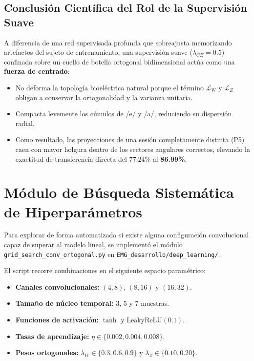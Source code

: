 \documentclass[11pt,a4paper,openany]{book}
\theoremstyle{definition}
\begin{document}
\subsection{Conclusión Científica del Rol de la Supervisión Suave}
\label{subsec:conclusion_supervision}

A diferencia de una red supervisada profunda que sobreajusta memorizando artefactos del sujeto de entrenamiento, una supervisión suave ($\lambda_{CE} = 0.5$) confinada sobre un cuello de botella ortogonal bidimensional actúa como una \textbf{fuerza de centrado}:
\begin{itemize}
    \item No deforma la topología bioeléctrica natural porque el término $\mathcal{L}_W$ y $\mathcal{L}_Z$ obligan a conservar la ortogonalidad y la varianza unitaria.
    \item Compacta levemente los cúmulos de /e/ y /a/, reduciendo su dispersión radial.
    \item Como resultado, las proyecciones de una sesión completamente distinta (P5) caen con mayor holgura dentro de los sectores angulares correctos, elevando la exactitud de transferencia directa del $77.24\%$ al \textbf{86.99\%}.
\end{itemize}

\section{Módulo de Búsqueda Sistemática de Hiperparámetros}
\label{sec:grid_search}

Para explorar de forma automatizada si existe alguna configuración convolucional capaz de superar al modelo lineal, se implementó el módulo \texttt{grid\_search\_conv\_ortogonal.py} en \texttt{EMG\_desarrollo/deep\_learning/}.

El script recorre combinaciones en el siguiente espacio paramétrico:
\begin{itemize}
    \item \textbf{Canales convolucionales:} $(4, 8)$, $(8, 16)$ y $(16, 32)$.
    \item \textbf{Tamaño de núcleo temporal:} $3$, $5$ y $7$ muestras.
    \item \textbf{Funciones de activación:} $\tanh$ y $\text{LeakyReLU}(0.1)$.
    \item \textbf{Tasas de aprendizaje:} $\eta \in \{0.002, 0.004, 0.008\}$.
    \item \textbf{Pesos ortogonales:} $\lambda_W \in \{0.3, 0.6, 0.9\}$ y $\lambda_Z \in \{0.10, 0.20\}$.
\end{itemize}
\end{document}
